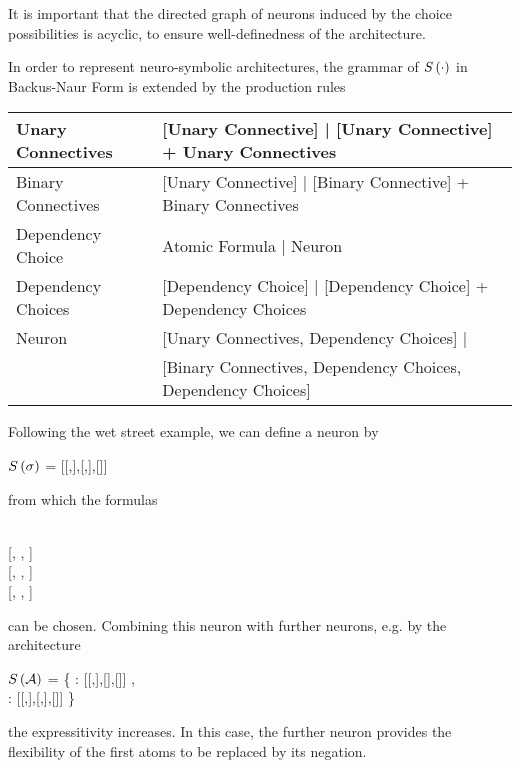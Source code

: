 It is important that the directed graph of neurons induced by the choice possibilities is acyclic, to ensure well-definedness of the architecture.


In order to represent neuro-symbolic architectures, the grammar of $S\left(\cdot\right)$ in Backus-Naur Form is extended by the production rules \\
\begin{tabular}{|l|l|}
  	\hline
 	Unary Connectives & [Unary Connective] | [Unary Connective] + Unary Connectives \\
  	\hline
 	Binary Connectives & [Unary Connective] | [Binary Connective] + Binary Connectives \\
  	\hline
 	Dependency Choice & Atomic Formula | Neuron \\
  	\hline
	Dependency Choices & [Dependency Choice] | [Dependency Choice] + Dependency Choices \\
	\hline
	Neuron & [Unary Connectives, Dependency Choices] | \\
	&  [Binary Connectives, Dependency Choices, Dependency Choices] \\
	\hline
\end{tabular}


\begin{example}
	Following the wet street example, we can define a neuron by
	\begin{centeredcode}
		$S\left(\sigma\right)$ = [[,],[,],[]]
	\end{centeredcode}
	from which the formulas
	\begin{centeredcode}
		[\stringof{imp}, \stringof{Wet}, \stringof{Street}] \\
		\hspace{0.25cm} [, , \stringof{Street}] \\
		\hspace{1cm}[, , \stringof{Street}] \\
		\hspace{1cm}[, , \stringof{Street}]
	\end{centeredcode}
	can be chosen.
	Combining this neuron with further neurons, e.g. by the architecture
	\begin{centeredcode}
		$S\left(\mathcal{A}\right)$ = \{ : [[,],[],[]] , \\
		\hspace{1.8cm}: [[,],[,],[]] \}
	\end{centeredcode}
	the expressitivity increases.
	In this case, the further neuron provides the flexibility of the first atoms to be replaced by its negation.
\end{example}



